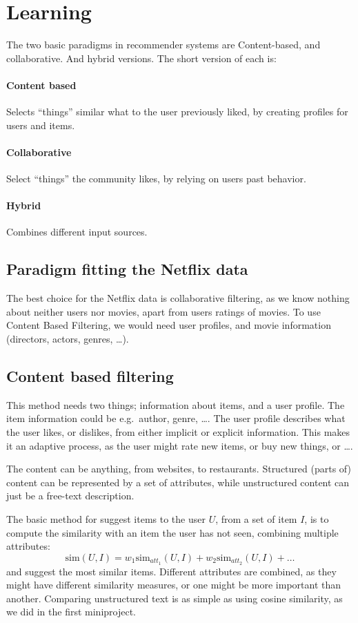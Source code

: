 \section{Learning}
The two basic paradigms in recommender systems are Content-based, and collaborative. And hybrid versions. The short version of each is:
\paragraph{Content based} Selects ``things'' similar what to the user previously liked, by creating profiles for users and items.
\paragraph{Collaborative} Select ``things'' the community likes, by relying on users past behavior.
\paragraph{Hybrid} Combines different input sources.

\subsection{Paradigm fitting the Netflix data}
The best choice for the Netflix data is collaborative filtering, as we know nothing about neither users nor movies, apart from users ratings of movies. To use Content Based Filtering, we would need user profiles, and movie information (directors, actors, genres, \ldots).

\subsection{Content based filtering}
This method needs two things; information about items, and a user profile.
The item information could be e.g.\ author, genre, \ldots.
The user profile describes what the user likes, or dislikes, from either implicit or explicit information.
This makes it an adaptive process, as the user might rate new items, or buy new things, or \ldots.

The content can be anything, from websites, to restaurants. Structured (parts of) content can be represented by a set of attributes, while unstructured content can just be a free-text description.

The basic method for suggest items to the user $U$, from a set of item $I$, is to compute the similarity with an item the user has not seen, combining multiple attributes:
\[
    \mathrm{sim}(U, I) = w_1 \mathrm{sim}_{att_1}(U, I) + w_2 \mathrm{sim}_{att_2}(U, I) + \ldots
\]
and suggest the most similar items.
Different attributes are combined, as they might have different similarity measures, or one might be more important than another.
Comparing unstructured text is as simple as using cosine similarity, as we did in the first miniproject.

